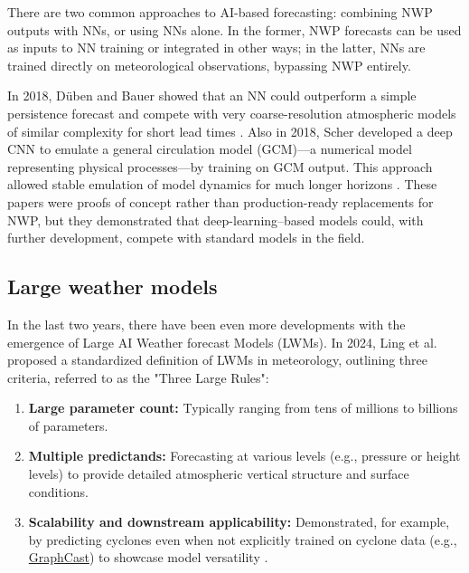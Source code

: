 There are two common approaches to AI-based forecasting: combining NWP outputs with NNs, or using NNs alone. In the former, NWP forecasts can be used as inputs to NN training or integrated in other ways; in the latter, NNs are trained directly on meteorological observations, bypassing NWP entirely.

In 2018, Düben and Bauer showed that an NN could outperform a simple persistence forecast and compete with very coarse-resolution atmospheric models of similar complexity for short lead times \cite{dueben2018}. Also in 2018, Scher developed a deep CNN to emulate a general circulation model (GCM)—a numerical model representing physical processes—by training on GCM output. This approach allowed stable emulation of model dynamics for much longer horizons \cite{scher2018}. These papers were proofs of concept rather than production-ready replacements for NWP, but they demonstrated that deep-learning–based models could, with further development, compete with standard models in the field.

\subsection*{Large weather models}
In the last two years, there have been even more developments with the emergence of Large AI Weather forecast Models (LWMs). In 2024, Ling et al.\ \cite{SecondRevolution} proposed a standardized definition of LWMs in meteorology, outlining three criteria, referred to as the "Three Large Rules":

\begin{enumerate}[label=\textbf{\arabic*}.,rightmargin=1.5em]
  \item \textbf{Large parameter count:} Typically ranging from tens of millions to billions of parameters.
  \item \textbf{Multiple predictands:} Forecasting at various levels (e.g., pressure or height levels) to provide detailed atmospheric vertical structure and surface conditions.
  \item \textbf{Scalability and downstream applicability:} Demonstrated, for example, by predicting cyclones even when not explicitly trained on cyclone data (e.g., \href{https://www.youtube.com/watch?v=PD1v5PCJs_o&ab_channel=GregBronevetsky}{GraphCast}) to showcase model versatility \cite{SecondRevolution}.
\end{enumerate}

